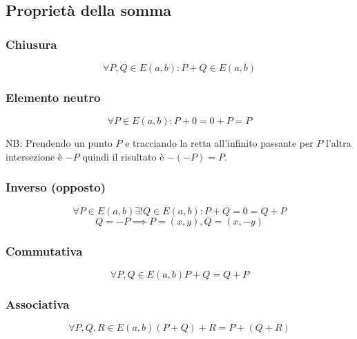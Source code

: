 \clearpage

\subsection{Proprietà della somma}
\subsubsection{Chiusura}
$$ \forall P, Q \in E(a,b): P+Q \in E(a,b) $$

\subsubsection{Elemento neutro}
$$ \forall P \in E(a,b): P + 0 = 0 + P = P $$

NB: Prendendo un punto $P$ e tracciando la retta all'infinito passante per $P$ l'altra intersezione è $-P$ quindi il risultato è $-(-P) = P$.

\subsubsection{Inverso (opposto)}
$$ \forall P \in E(a,b) \exists! Q \in E(a,b) : P + Q = 0 = Q + P$$
$$ Q = -P \implies P = (x,y), Q = (x, -y) $$

\subsubsection{Commutativa}
$$ \forall P, Q \in E(a,b) P + Q = Q + P $$

\subsubsection{Associativa}
$$ \forall P, Q, R \in E(a,b) (P + Q) + R = P + (Q + R) $$

